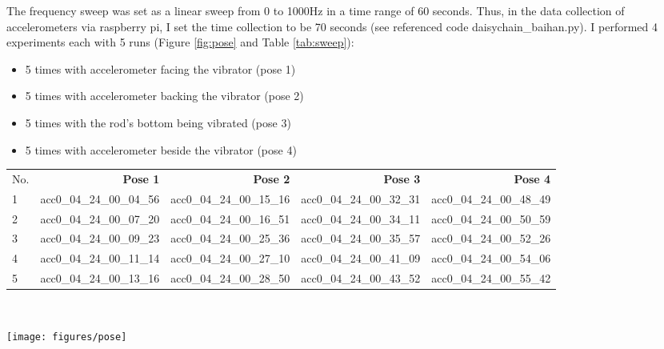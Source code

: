 \documentclass{sigchi}
\begin{document}
The frequency sweep was set as a linear sweep from 0 to 1000Hz in a time range of 60 seconds. Thus, in the data collection of accelerometers via raspberry pi, I set the time collection to be 70 seconds (see referenced code daisychain\_baihan.py). I performed 4 experiments each with 5 runs (Figure \ref{fig:pose} and Table \ref{tab:sweep}): 
\begin{itemize}
\item 5 times with accelerometer facing the vibrator (pose 1)
\item 5 times with accelerometer backing the vibrator (pose 2)
\item 5 times with the rod's bottom being vibrated (pose 3)
\item 5 times with accelerometer beside the vibrator (pose 4)
\end{itemize}

\begin{table*}
  \centering
  \begin{tabular}{l r r r r }
    No.
    & {\small{\textbf{Pose 1}}} 
    & {\small{\textbf{Pose 2}}}
    & {\small{\textbf{Pose 3}}} 
    & {\small{\textbf{Pose 4}}} \\
   1 & acc0\_04\_24\_00\_04\_56 & acc0\_04\_24\_00\_15\_16 & acc0\_04\_24\_00\_32\_31 & acc0\_04\_24\_00\_48\_49 \\
   2 & acc0\_04\_24\_00\_07\_20 & acc0\_04\_24\_00\_16\_51 & acc0\_04\_24\_00\_34\_11 & acc0\_04\_24\_00\_50\_59 \\
   3 & acc0\_04\_24\_00\_09\_23 & acc0\_04\_24\_00\_25\_36 & acc0\_04\_24\_00\_35\_57 & acc0\_04\_24\_00\_52\_26 \\
   4 & acc0\_04\_24\_00\_11\_14 & acc0\_04\_24\_00\_27\_10 & acc0\_04\_24\_00\_41\_09 & acc0\_04\_24\_00\_54\_06 \\
   5 & acc0\_04\_24\_00\_13\_16 & acc0\_04\_24\_00\_28\_50 & acc0\_04\_24\_00\_43\_52 & acc0\_04\_24\_00\_55\_42\\
  \end{tabular}
  \caption{references for the linear sweep experiments}~\label{tab:sweep}
\end{table*}

\begin{figure*}
  \centering
  \texttt{[image: figures/pose]}
  \caption{4 poses for accelerometers measurement: (a) accelerometer facing the vibrator; (b) accelerometer backing the vibrator; (c) the rod's bottom being vibrated; (d) accelerometer beside the vibrator.}
    ~\label{fig:pose}
\end{figure*}
\end{document}
